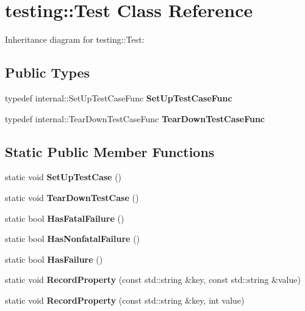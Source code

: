 \hypertarget{classtesting_1_1Test}{}\section{testing\+:\+:Test Class Reference}
\label{classtesting_1_1Test}


Inheritance diagram for testing\+:\+:Test\+:
\subsection*{Public Types}
\begin{DoxyCompactItemize}
\item 
\mbox{\label{classtesting_1_1Test_a5f2a051d1d99c9b784c666c586186cf9}} 
typedef internal\+::\+Set\+Up\+Test\+Case\+Func {\bfseries Set\+Up\+Test\+Case\+Func}
\item 
\mbox{\label{classtesting_1_1Test_aa0f532e93b9f3500144c53f31466976c}} 
typedef internal\+::\+Tear\+Down\+Test\+Case\+Func {\bfseries Tear\+Down\+Test\+Case\+Func}
\end{DoxyCompactItemize}
\subsection*{Static Public Member Functions}
\begin{DoxyCompactItemize}
\item 
\mbox{\label{classtesting_1_1Test_a5ccbac42fee8c5b00b0bfe89b6c49d79}} 
static void {\bfseries Set\+Up\+Test\+Case} ()
\item 
\mbox{\label{classtesting_1_1Test_af374706cbaf0ffc460f4fd04e7c150f1}} 
static void {\bfseries Tear\+Down\+Test\+Case} ()
\item 
\mbox{\label{classtesting_1_1Test_aa8d0725cfb519f82eaf4fd2d2f46d97d}} 
static bool {\bfseries Has\+Fatal\+Failure} ()
\item 
\mbox{\label{classtesting_1_1Test_a3b933cea62eff67a05e23aa07f38bf29}} 
static bool {\bfseries Has\+Nonfatal\+Failure} ()
\item 
\mbox{\label{classtesting_1_1Test_a7a00be7dd0a6bfdc8d47a1b784623613}} 
static bool {\bfseries Has\+Failure} ()
\item 
\mbox{\label{classtesting_1_1Test_a7b20a48c0bbc9dd1fe96715e4a5c0164}} 
static void {\bfseries Record\+Property} (const std\+::string \&key, const std\+::string \&value)
\item 
\mbox{\label{classtesting_1_1Test_afb8d29af28e48dc65b2b743f1874ccfe}} 
static void {\bfseries Record\+Property} (const std\+::string \&key, int value)
\end{DoxyCompactItemize}
